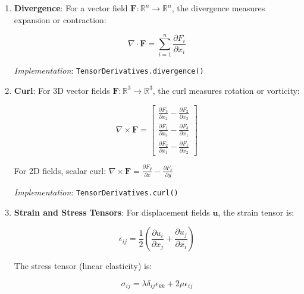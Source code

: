 \documentclass[10pt,journal,compsoc]{IEEEtran}
\begin{document}
\begin{enumerate}
    \item \textbf{Divergence}: For a vector field $\mathbf{F}: \mathbb{R}^n \rightarrow \mathbb{R}^n$, the divergence measures expansion or contraction:
    
    \begin{equation}
        \nabla \cdot \mathbf{F} = \sum_{i=1}^{n} \frac{\partial F_i}{\partial x_i}
    \end{equation}
    
    
    \textit{Implementation}: \texttt{TensorDerivatives.divergence()}
    
    \item \textbf{Curl}: For 3D vector fields $\mathbf{F}: \mathbb{R}^3 \rightarrow \mathbb{R}^3$, the curl measures rotation or vorticity:
    
    \begin{equation}
        \nabla \times \mathbf{F} = \begin{bmatrix}
        \frac{\partial F_3}{\partial x_2} - \frac{\partial F_2}{\partial x_3} \\
        \frac{\partial F_1}{\partial x_3} - \frac{\partial F_3}{\partial x_1} \\
        \frac{\partial F_2}{\partial x_1} - \frac{\partial F_1}{\partial x_2}
        \end{bmatrix}
    \end{equation}
    
    For 2D fields, scalar curl: $\nabla \times \mathbf{F} = \frac{\partial F_y}{\partial x} - \frac{\partial F_x}{\partial y}$
    
    
    \textit{Implementation}: \texttt{TensorDerivatives.curl()}
    
    \item \textbf{Strain and Stress Tensors}: For displacement fields $\mathbf{u}$, the strain tensor is:
    
    \begin{equation}
        \epsilon_{ij} = \frac{1}{2}\left(\frac{\partial u_i}{\partial x_j} + \frac{\partial u_j}{\partial x_i}\right)
    \end{equation}
    
    The stress tensor (linear elasticity) is:
    
    \begin{equation}
        \sigma_{ij} = \lambda \delta_{ij} \epsilon_{kk} + 2\mu \epsilon_{ij}
    \end{equation}
    

\end{enumerate}
\end{document}
